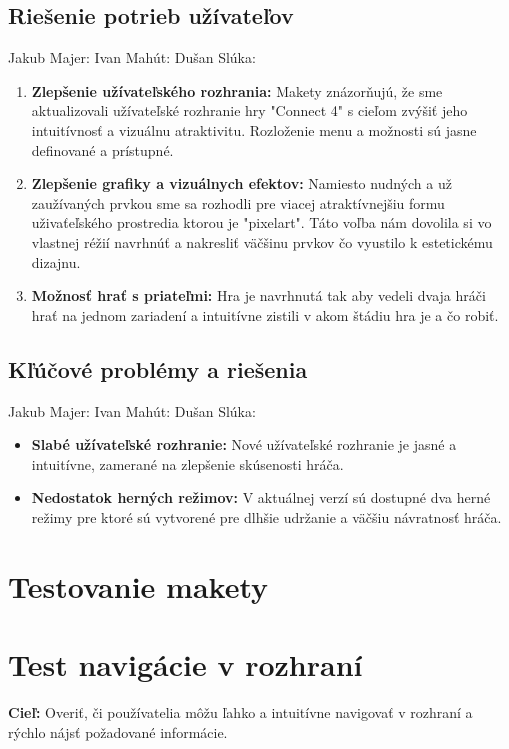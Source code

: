 \documentclass[a4paper, 11pt, onecolumn]{article}
\begin{document}
\subsection{Riešenie potrieb užívateľov}
Jakub Majer:
Ivan Mahút:
Dušan Slúka:
\begin{enumerate}
    \item \textbf{Zlepšenie užívateľského rozhrania:} Makety znázorňujú, že sme aktualizovali užívateľské rozhranie hry "Connect 4" s cieľom zvýšiť jeho intuitívnosť a vizuálnu atraktivitu. Rozloženie menu a možnosti sú jasne definované a prístupné.
    \item \textbf{Zlepšenie grafiky a vizuálnych efektov:} Namiesto nudných a už zaužívaných prvkou sme sa rozhodli pre viacej atraktívnejšiu formu uživaťeľského prostredia ktorou je "pixelart". Táto voľba nám dovolila si vo vlastnej réžií navrhnúť a nakresliť väčšinu prvkov čo vyustilo k estetickému dizajnu.
    \item \textbf{Možnosť hrať s priateľmi:} Hra je navrhnutá tak aby vedeli dvaja hráči hrať na jednom zariadení a intuitívne zistili v akom štádiu hra je a čo robiť.
\end{enumerate}

\subsection{Kľúčové problémy a riešenia}
Jakub Majer:
Ivan Mahút:
Dušan Slúka:
\begin{itemize}
    \item \textbf{Slabé užívateľské rozhranie:} Nové užívateľské rozhranie je jasné a intuitívne, zamerané na zlepšenie skúsenosti hráča.
    \item \textbf{Nedostatok herných režimov:} V aktuálnej verzí sú dostupné dva herné režimy pre ktoré sú vytvorené pre dlhšie udržanie a väčšiu návratnosť hráča.
\end{itemize}


\section{Testovanie makety}
\section{Test navigácie v rozhraní}


\textbf{Cieľ:} Overiť, či používatelia môžu ľahko a intuitívne navigovať v rozhraní a rýchlo nájsť požadované informácie.
\end{document}
